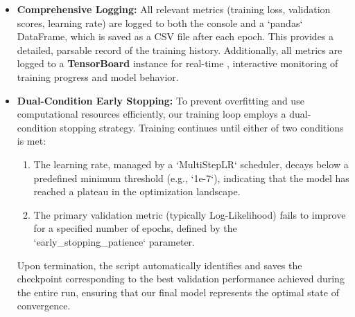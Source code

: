 \begin{itemize}
\begin{lstlisting}
    # Priority 2: If no local checkpoint, check for an external 'resume_ckpt'
    # This is used for transfer learning between stages (e.g., fine-tuning)
    elif stage_config.resume_ckpt:
        print(f"Starting new fine-tuning stage from: {stage_config.resume_ckpt}")
        return stage_config.resume_ckpt # Start a new stage from a previous one
    
    # Priority 3: No checkpoints found, start from scratch
    else:
        print("No checkpoints found. Starting training from random initialization.")
        return None
    \end{lstlisting}
    
    This ensures that an interrupted run will always pick up from where it left off, while a new fine-tuning stage will correctly load the weights from its designated prerequisite, as managed by the orchestrator.

    \item \textbf{Comprehensive Logging:} All relevant metrics (training loss, validation scores, learning rate) are logged to both the console and a `pandas` DataFrame, which is saved as a CSV file after each epoch. This provides a detailed, parsable record of the training history. Additionally, all metrics are logged to a \textbf{TensorBoard} instance for real-time \cite{tensorflow2015-whitepaper}, interactive monitoring of training progress and model behavior.

    \item \textbf{Dual-Condition Early Stopping:} To prevent overfitting and use computational resources efficiently, our training loop employs a dual-condition stopping strategy. Training continues until either of two conditions is met:
    \begin{enumerate}
        \item The learning rate, managed by a `MultiStepLR` scheduler, decays below a predefined minimum threshold (e.g., `1e-7`), indicating that the model has reached a plateau in the optimization landscape.
        \item The primary validation metric (typically Log-Likelihood) fails to improve for a specified number of epochs, defined by the `early\_stopping\_patience` parameter.
    \end{enumerate}
    Upon termination, the script automatically identifies and saves the checkpoint corresponding to the best validation performance achieved during the entire run, ensuring that our final model represents the optimal state of convergence.
\end{itemize}
